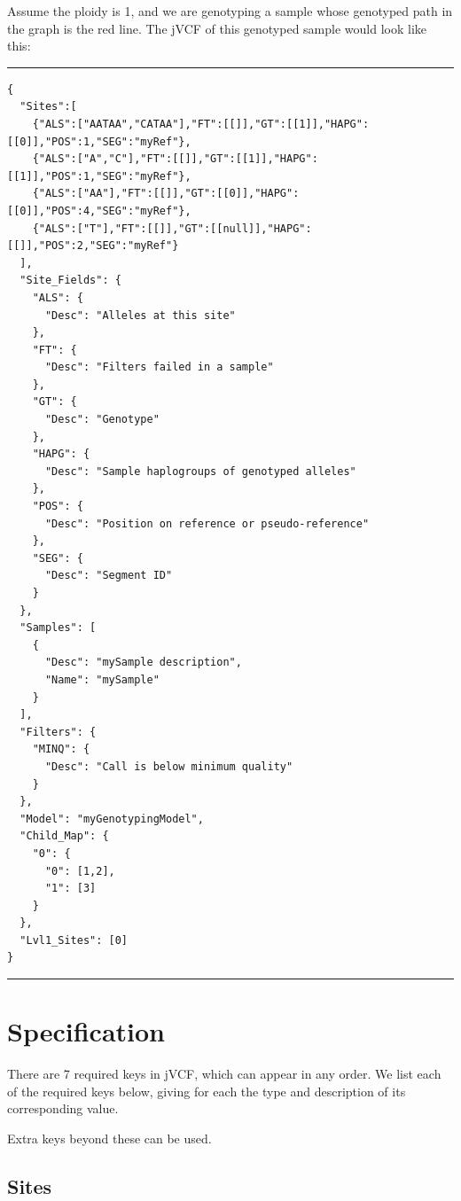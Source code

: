 Assume the ploidy is 1, and we are genotyping a sample whose genotyped
path in the graph is the red line. The jVCF of this genotyped sample
would look like this:

\newpage

\begin{center}\rule{0.5\linewidth}{0.5pt}\end{center}

\begin{verbatim}
{
  "Sites":[
    {"ALS":["AATAA","CATAA"],"FT":[[]],"GT":[[1]],"HAPG":[[0]],"POS":1,"SEG":"myRef"},
    {"ALS":["A","C"],"FT":[[]],"GT":[[1]],"HAPG":[[1]],"POS":1,"SEG":"myRef"},
    {"ALS":["AA"],"FT":[[]],"GT":[[0]],"HAPG":[[0]],"POS":4,"SEG":"myRef"},
    {"ALS":["T"],"FT":[[]],"GT":[[null]],"HAPG":[[]],"POS":2,"SEG":"myRef"}
  ],
  "Site_Fields": {
    "ALS": {
      "Desc": "Alleles at this site"
    },
    "FT": {
      "Desc": "Filters failed in a sample"
    },
    "GT": {
      "Desc": "Genotype"
    },
    "HAPG": {
      "Desc": "Sample haplogroups of genotyped alleles"
    },
    "POS": {
      "Desc": "Position on reference or pseudo-reference"
    },
    "SEG": {
      "Desc": "Segment ID"
    }
  },
  "Samples": [
    {
      "Desc": "mySample description",
      "Name": "mySample"
    }
  ],
  "Filters": {
    "MINQ": {
      "Desc": "Call is below minimum quality"
    }
  },
  "Model": "myGenotypingModel",
  "Child_Map": {
    "0": {
      "0": [1,2],
      "1": [3]
    }
  },
  "Lvl1_Sites": [0]
}
\end{verbatim}

\begin{center}\rule{0.5\linewidth}{0.5pt}\end{center}

\newpage

\hypertarget{specification}{%
\section{Specification}\label{specification}}

There are 7 required keys in jVCF, which can appear in any order. We
list each of the required keys below, giving for each the type and
description of its corresponding value.

Extra keys beyond these can be used.

\hypertarget{sites}{%
\subsection{Sites}\label{sites}}

